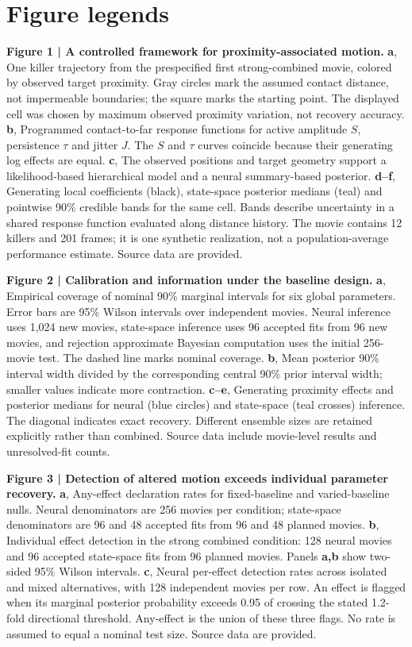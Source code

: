 \documentclass[12pt]{article}
\begin{document}
\section*{Figure legends}
\textbf{Figure 1 | A controlled framework for proximity-associated motion.}
\textbf{a}, One killer trajectory from the prespecified first strong-combined movie, colored by observed target proximity. Gray circles mark the assumed contact distance, not impermeable boundaries; the square marks the starting point. The displayed cell was chosen by maximum observed proximity variation, not recovery accuracy. \textbf{b}, Programmed contact-to-far response functions for active amplitude $S$, persistence $\tau$ and jitter $J$. The $S$ and $\tau$ curves coincide because their generating log effects are equal. \textbf{c}, The observed positions and target geometry support a likelihood-based hierarchical model and a neural summary-based posterior. \textbf{d--f}, Generating local coefficients (black), state-space posterior medians (teal) and pointwise 90\% credible bands for the same cell. Bands describe uncertainty in a shared response function evaluated along distance history. The movie contains 12 killers and 201 frames; it is one synthetic realization, not a population-average performance estimate. Source data are provided.

\textbf{Figure 2 | Calibration and information under the baseline design.}
\textbf{a}, Empirical coverage of nominal 90\% marginal intervals for six global parameters. Error bars are 95\% Wilson intervals over independent movies. Neural inference uses 1,024 new movies, state-space inference uses 96 accepted fits from 96 new movies, and rejection approximate Bayesian computation uses the initial 256-movie test. The dashed line marks nominal coverage. \textbf{b}, Mean posterior 90\% interval width divided by the corresponding central 90\% prior interval width; smaller values indicate more contraction. \textbf{c--e}, Generating proximity effects and posterior medians for neural (blue circles) and state-space (teal crosses) inference. The diagonal indicates exact recovery. Different ensemble sizes are retained explicitly rather than combined. Source data include movie-level results and unresolved-fit counts.

\textbf{Figure 3 | Detection of altered motion exceeds individual parameter recovery.}
\textbf{a}, Any-effect declaration rates for fixed-baseline and varied-baseline nulls. Neural denominators are 256 movies per condition; state-space denominators are 96 and 48 accepted fits from 96 and 48 planned movies. \textbf{b}, Individual effect detection in the strong combined condition: 128 neural movies and 96 accepted state-space fits from 96 planned movies. Panels \textbf{a,b} show two-sided 95\% Wilson intervals. \textbf{c}, Neural per-effect detection rates across isolated and mixed alternatives, with 128 independent movies per row. An effect is flagged when its marginal posterior probability exceeds 0.95 of crossing the stated 1.2-fold directional threshold. Any-effect is the union of these three flags. No rate is assumed to equal a nominal test size. Source data are provided.
\end{document}

